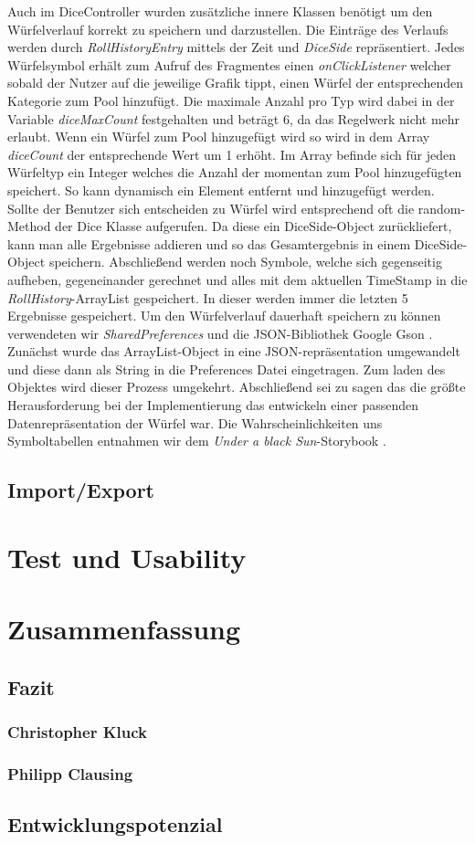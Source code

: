 Auch im DiceController wurden zusätzliche innere Klassen benötigt um den Würfelverlauf korrekt zu speichern und darzustellen. Die Einträge des Verlaufs werden durch \textit{RollHistoryEntry} mittels der Zeit und \textit{DiceSide} repräsentiert. Jedes Würfelsymbol erhält zum Aufruf des Fragmentes einen \textit{onClickListener} welcher sobald der Nutzer auf die jeweilige Grafik tippt, einen Würfel der entsprechenden Kategorie zum \grqq Pool\grqq{} hinzufügt. Die maximale Anzahl pro Typ wird dabei in der Variable \textit{diceMaxCount} festgehalten und beträgt 6, da das Regelwerk nicht mehr erlaubt. Wenn ein Würfel zum Pool hinzugefügt wird so wird in dem Array \textit{diceCount} der entsprechende Wert um 1 erhöht. Im Array befinde sich für jeden Würfeltyp ein Integer welches die Anzahl der momentan zum Pool hinzugefügten speichert. So kann dynamisch ein Element entfernt und hinzugefügt werden. Sollte der Benutzer sich entscheiden zu Würfel wird entsprechend oft die random-Method der Dice Klasse aufgerufen. Da diese ein DiceSide-Object zurückliefert, kann man alle Ergebnisse addieren und so das Gesamtergebnis in einem DiceSide-Object speichern. Abschließend werden noch Symbole, welche sich gegenseitig aufheben, gegeneinander gerechnet und alles mit dem aktuellen TimeStamp in die \textit{RollHistory}-ArrayList gespeichert. In dieser werden immer die letzten 5 Ergebnisse gespeichert. Um den Würfelverlauf dauerhaft speichern zu können verwendeten wir \textit{SharedPreferences} und die JSON-Bibliothek Google Gson \cite{gson}. Zunächst wurde das ArrayList-Object in eine JSON-repräsentation umgewandelt und diese dann als String in die Preferences Datei eingetragen. Zum laden des Objektes wird dieser Prozess umgekehrt. Abschließend sei zu sagen das die größte Herausforderung bei der Implementierung das entwickeln einer passenden Datenrepräsentation der Würfel war. Die Wahrscheinlichkeiten uns Symboltabellen entnahmen wir dem \textit{Under a black Sun}-Storybook \cite{adventurebook}.

\subsection{Import/Export}
\section{Test und Usability}

\section{Zusammenfassung}
\subsection{Fazit}
\subsubsection{Christopher Kluck}
\subsubsection{Philipp Clausing}
\subsection{Entwicklungspotenzial}
